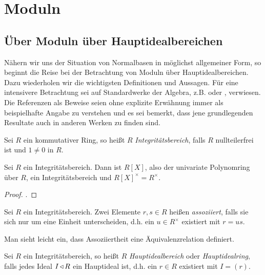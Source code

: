 \chapter{Moduln}

\section{Über Moduln über Hauptidealbereichen}

Nähern wir uns der Situation von Normalbasen in möglichst allgemeiner Form, so
beginnt die Reise bei der Betrachtung von Moduln über Hauptidealbereichen. Dazu
wiederholen wir die wichtigsten Definitionen und Aussagen. Für eine intensivere
Betrachtung sei auf Standardwerke der Algebra, z.B. 
\autocite{lang2002algebra} oder \autocite{hartley1974rings}, verwiesen.
Die Referenzen als Beweise seien ohne explizite Erwähnung immer 
als beispielhafte Angabe zu verstehen und es
sei bemerkt, dass jene grundlegenden Resultate auch in anderen Werken zu 
finden sind.

\begin{definition}[Integritätsbereich]
  Sei $R$ ein kommutativer Ring, so heißt $R$ \emph{Integritätsbereich},
  falls $R$ nullteilerfrei ist und $1\neq 0$ in $R$.
\end{definition}

\begin{lemma}
  Sei $R$ ein Integritätsbereich. Dann ist $R[X]$, also der 
  univariate Polynomring über $R$, ein Integritätsbereich und
  $R[X]^\times = R^\times$.
\end{lemma}
\begin{proof}
  \autocite[Lemma 13.4]{karpfinger2010algebra}.
\end{proof}

\begin{definition}
  Sei $R$ ein Integritätsbereich. Zwei Elemente $r,s\in R$ heißen 
  \emph{assoziiert}, falls sie sich nur um eine Einheit unterscheiden, d.h. ein
  $u \in R^\times$ existiert mit $r = us$.
\end{definition}

\begin{bemerkung}
  Man sieht leicht ein, dass Assoziiertheit eine Äquivalenzrelation definiert.
\end{bemerkung}

\begin{definition}[Hauptidealbereich]
  Sei $R$ ein Integritätsbereich, so heißt $R$ \emph{Hauptidealbereich}
  oder \emph{Hauptidealring}, falls jedes Ideal $I\operatorname{\triangleleft} R$ ein
  Hauptideal ist, d.h. ein $r \in R$ existiert mit
  $I = (r)$.
\end{definition}


